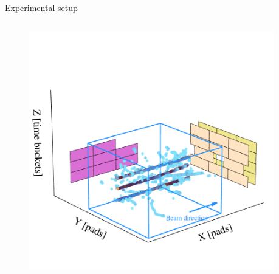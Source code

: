 \documentclass[aspectratio=43, dvipsnames]{beamer}
\begin{document}
\begin{frame}{Experimental setup}
\begin{columns}[t]
\begin{column}{0.45\linewidth}
\begin{figure}
\begin{center}
					\includegraphics[width=0.95\textwidth]{figures/setup.pdf}
				\end{center}
			\end{figure}

		\end{column}
	\end{columns}

\end{frame}
\end{document}

